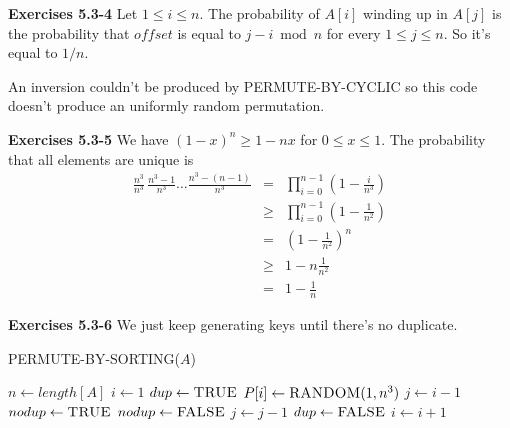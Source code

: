\documentclass[a4paper,12pt]{article}
\newcommand{\newpar}[1]
{\bigskip \noindent \textbf{Exercises #1} \newline}
\newcommand{\la}{\leftarrow}
\begin{document}
\newpar{5.3-4}
Let $1\le i\le n$.  The probability of $A[i]$ winding up in $A[j]$ is
the probability that $offset$ is equal to $j - i \bmod n$ for every
$1\le j\le n$.  So it's equal to $1/n$.

An inversion couldn't be produced by \textsc{PERMUTE-BY-CYCLIC} so
this code doesn't produce an uniformly random permutation.

\newpar{5.3-5}
We have $(1-x)^n \ge 1 - nx$ for $0\le x\le 1$.  The
probability that all elements are unique is
\begin{eqnarray*}
  \frac{n^3}{n^3}\,\frac{n^3-1}{n^3}\ldots \frac{n^3-(n-1)}{n^3} &=&
  \prod_{i=0}^{n-1} \left(1 - \frac{i}{n^3}\right) \\
  &\ge& \prod_{i=0}^{n-1}\left(1 - \frac{1}{n^2}\right) \\
  &=& \left(1 - \frac{1}{n^2}\right)^n \\
  &\ge& 1 - n \frac{1}{n^2} \\
  &=& 1 - \frac{1}{n}
\end{eqnarray*}

\newpage
\newpar{5.3-6}
We just keep generating keys until there's no duplicate.

\medskip
\noindent
\textsc{PERMUTE-BY-SORTING}($A$)
\begin{algorithmic}
  \STATE $n \la length[A]$
  \STATE $i \la 1$
  \STATE $dup \la \textsc{TRUE}$
  \STATE $P[i] \la \textsc{RANDOM}(1, n^3)$
  \STATE $j \la i-1$
  \STATE $nodup \la \textsc{TRUE}$
  \STATE $nodup \la \textsc{FALSE}$
  \ELSE
  \STATE $j \la j-1$
  \ENDIF
  \ENDWHILE
  \STATE $dup \la \textsc{FALSE}$
  \ENDIF
  \ENDWHILE
  \STATE $i \la i+1$
  \ENDWHILE
  \STATE {}
\end{algorithmic}
\end{document}
